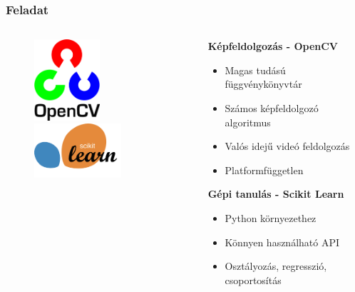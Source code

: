 \documentclass{beamer}
\begin{document}
\begin{frame}[fragile]
\frametitle{Feladat}

\begin{columns}
    \begin{column}{4cm}
		\begin{figure}[htb]
			\includegraphics[height=3cm]{images/OpenCV-logo.png}
			
			\bigskip
			
			\includegraphics[height=2cm]{images/scikit-learn-logo.png}
		\end{figure}
    \end{column}

    \begin{column}{7cm}
    		\textbf{Képfeldolgozás - OpenCV}
		\begin{itemize}
    			\item Magas tudású függvénykönyvtár
    			\item Számos képfeldolgozó algoritmus
    			\item Valós idejű videó feldolgozás
			\item Platformfüggetlen
		\end{itemize}
		\bigskip
		\textbf{Gépi tanulás - Scikit Learn}
		\begin{itemize}
    			\item Python környezethez
    			\item Könnyen használható API
    			\item Osztályozás, regresszió, csoportosítás
		\end{itemize}
    \end{column}
\end{columns}

\end{frame}
\end{document}
